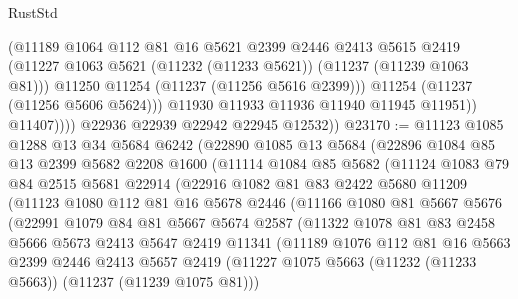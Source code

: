 \begin{lexlean}{RustStd}
\begin{coremodule}
                      (@11189
                        @1064
                        @112
                        @81
                        @16
                        @5621
                        @2399
                        @2446
                        @2413
                        @5615
                        @2419
                        (@11227 @1063 @5621 (@11232 (@11233 @5621)) (@11237 (@11239 @1063 @81)))
                        @11250
                        @11254
                        (@11237 (@11256 @5616 @2399)))
                      @11254
                      (@11237 (@11256 @5606 @5624)))
                    @11930
                    @11933
                    @11936
                    @11940
                    @11945
                    @11951))
                @11407))))
        @22936
        @22939
        @22942
        @22945
        @12532))
@23170 := @11123
    @1085
    @1288
    @13
    @34
    @5684
    @6242
    (@22890
      @1085
      @13
      @5684
      (@22896
        @1084
        @85
        @13
        @2399
        @5682
        @2208
        @1600
        (@11114
          @1084
          @85
          @5682
          (@11124
            @1083
            @79
            @84
            @2515
            @5681
            @22914
            (@22916
              @1082
              @81
              @83
              @2422
              @5680
              @11209
              (@11123
                @1080
                @112
                @81
                @16
                @5678
                @2446
                (@11166
                  @1080
                  @81
                  @5667
                  @5676
                  (@22991
                    @1079
                    @84
                    @81
                    @5667
                    @5674
                    @2587
                    (@11322
                      @1078
                      @81
                      @83
                      @2458
                      @5666
                      @5673
                      @2413
                      @5647
                      @2419
                      @11341
                      (@11189
                        @1076
                        @112
                        @81
                        @16
                        @5663
                        @2399
                        @2446
                        @2413
                        @5657
                        @2419
                        (@11227 @1075 @5663 (@11232 (@11233 @5663)) (@11237 (@11239 @1075 @81)))

\end{coremodule}
\end{lexlean}
